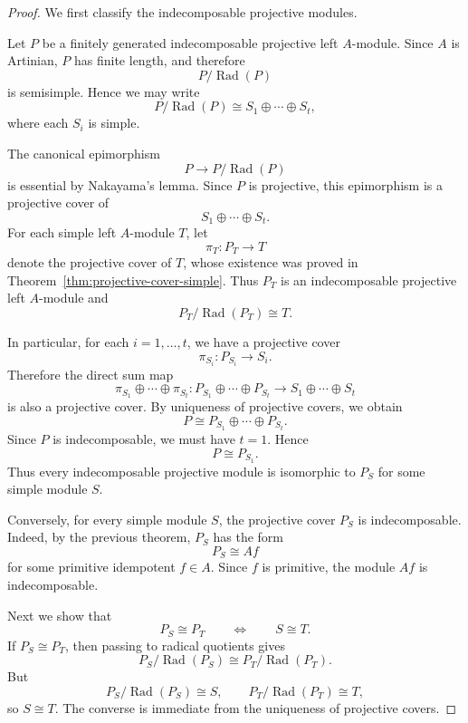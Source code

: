 \begin{proof}
    We first classify the indecomposable projective modules.

    Let $P$ be a finitely generated indecomposable projective left $A$-module. Since $A$
    is Artinian, $P$ has finite length, and therefore
    \[
        P/\operatorname{Rad}(P)
    \]
    is semisimple. Hence we may write
    \[
        P/\operatorname{Rad}(P)\cong S_1\oplus \cdots \oplus S_t,
    \]
    where each $S_i$ is simple.

    The canonical epimorphism
    \[
        P\longrightarrow P/\operatorname{Rad}(P)
    \]
    is essential by Nakayama's lemma. Since $P$ is projective, this epimorphism is a
    projective cover of
    \[
        S_1\oplus \cdots \oplus S_t.
    \]
    For each simple left $A$-module $T$, let
    \[
        \pi_T:P_T\longrightarrow T
    \]
    denote the projective cover of $T$, whose existence was proved in
    Theorem~\ref{thm:projective-cover-simple}. Thus $P_T$ is an indecomposable
    projective left $A$-module and
    \[
        P_T/\operatorname{Rad}(P_T)\cong T.
    \]

    In particular, for each $i=1,\dots,t$, we have a projective cover
    \[
        \pi_{S_i}:P_{S_i}\longrightarrow S_i.
    \]
    Therefore the direct sum map
    \[
        \pi_{S_1}\oplus\cdots\oplus \pi_{S_t}:
        P_{S_1}\oplus \cdots \oplus P_{S_t}
        \longrightarrow
        S_1\oplus \cdots \oplus S_t
    \]
    is also a projective cover. By uniqueness of projective covers, we obtain
    \[
        P\cong P_{S_1}\oplus \cdots \oplus P_{S_t}.
    \]
    Since $P$ is indecomposable, we must have $t=1$. Hence
    \[
        P\cong P_{S_1}.
    \]
    Thus every indecomposable projective module is isomorphic to $P_S$ for some simple
    module $S$.

    Conversely, for every simple module $S$, the projective cover $P_S$ is indecomposable.
    Indeed, by the previous theorem, $P_S$ has the form
    \[
        P_S\cong Af
    \]
    for some primitive idempotent $f\in A$. Since $f$ is primitive, the module $Af$ is
    indecomposable.

    Next we show that
    \[
        P_S\cong P_T
        \qquad\Longleftrightarrow\qquad
        S\cong T.
    \]
    If $P_S\cong P_T$, then passing to radical quotients gives
    \[
        P_S/\operatorname{Rad}(P_S)
        \cong
        P_T/\operatorname{Rad}(P_T).
    \]
    But
    \[
        P_S/\operatorname{Rad}(P_S)\cong S,
        \qquad
        P_T/\operatorname{Rad}(P_T)\cong T,
    \]
    so $S\cong T$. The converse is immediate from the uniqueness of projective covers.


\end{proof}
